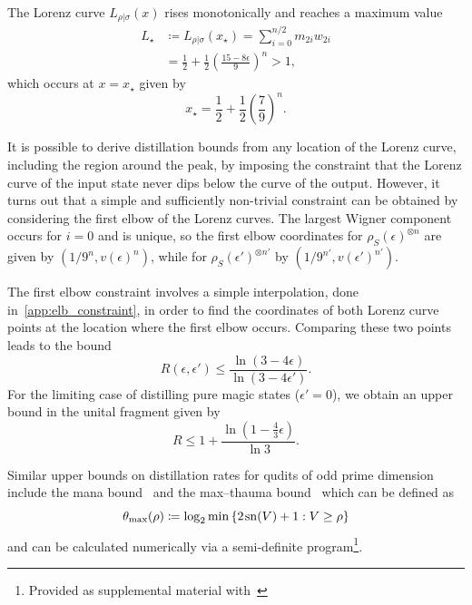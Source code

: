 \documentclass[pra,
aps,
twocolumn,
superscriptaddress,
groupedaddress,
nofootinbib,
reprint
]{revtex4-1}
\begin{document}
The Lorenz curve $L_{\rho|\sigma}(x)$ rises monotonically and reaches a maximum value
\begin{align}\label{eq:lcsu_max}
	L_\star &\coloneqq L_{\rho |\sigma} (x_\star) = \sum_{i = 0}^{n/2} m_{2i} w_{2i} \nonumber\\
	&= \frac{1}{2} + \frac{1}{2}\left(\frac{15 - 8\epsilon}{9}\right)^n > 1,
\end{align}
which occurs at $x=x_\star$ given by
\begin{equation}
	x_\star = \frac{1}{2} + \frac{1}{2}\left(\frac{7}{9}\right)^n.
\end{equation}

It is possible to derive distillation bounds from any location of the Lorenz curve, including the region around the peak, by imposing the constraint that the Lorenz curve of the input state never dips below the curve of the output.
However, it turns out that a simple and sufficiently non-trivial constraint can be obtained by considering the first elbow of the Lorenz curves. 
The largest Wigner component occurs for $i=0$ and is unique, so the first elbow coordinates for $\rho_S(\epsilon)^{\otimes n}$ are given by $(1/9^n, v(\epsilon)^n)$, while for $\rho_S(\epsilon')^{\otimes n'}$ by $(1/9^{n'}, v(\epsilon')^{n'})$.

The first elbow constraint involves a simple interpolation, done in~\cref{app:elb_constraint}, in order to find the coordinates of both Lorenz curve points at the location where the first elbow occurs. 
Comparing these two points leads to the bound
\begin{equation}
	R(\epsilon, \epsilon') \leq \frac{\ln{(3-4\epsilon)}}{\ln{(3-4\epsilon')}}.
\end{equation}
For the limiting case of distilling pure magic states ($\epsilon'=0$), we obtain an upper bound in the unital fragment given by
\begin{equation}
	R \leq 1 + \frac{\ln (1 - \frac{4}{3} \epsilon)}{\ln 3}.
\end{equation}

Similar upper bounds on distillation rates for qudits of odd prime dimension include the mana bound~\cite{cit:veitch} and the max--thauma bound~\cite{Wang_2020} which can be defined as
\begin{equation}
	\theta_{\rm{max}}(\rho) \coloneqq \log_2{\min{\{2\hspace{1pt} {{\rm{sn}}(V)} +1 : V \geq \rho\}}}
\end{equation}
and can be calculated numerically via a semi-definite program\footnote{Provided as supplemental material with~\cite{Wang_2020}}.
\end{document}
